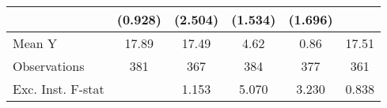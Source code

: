 {\begin{tabular}{l*{5}{c}}
            &     (0.928)         &     (2.504)         &     (1.534)         &     (1.696)         &                     \\
\midrule
Mean Y      &       17.89         &       17.49         &        4.62         &        0.86         &       17.51         \\
Observations&         381         &         367         &         384         &         377         &         361         \\
Exc. Inst. F-stat&                     &       1.153         &       5.070         &       3.230         &       0.838         \\
\bottomrule
\end{tabular}
}

